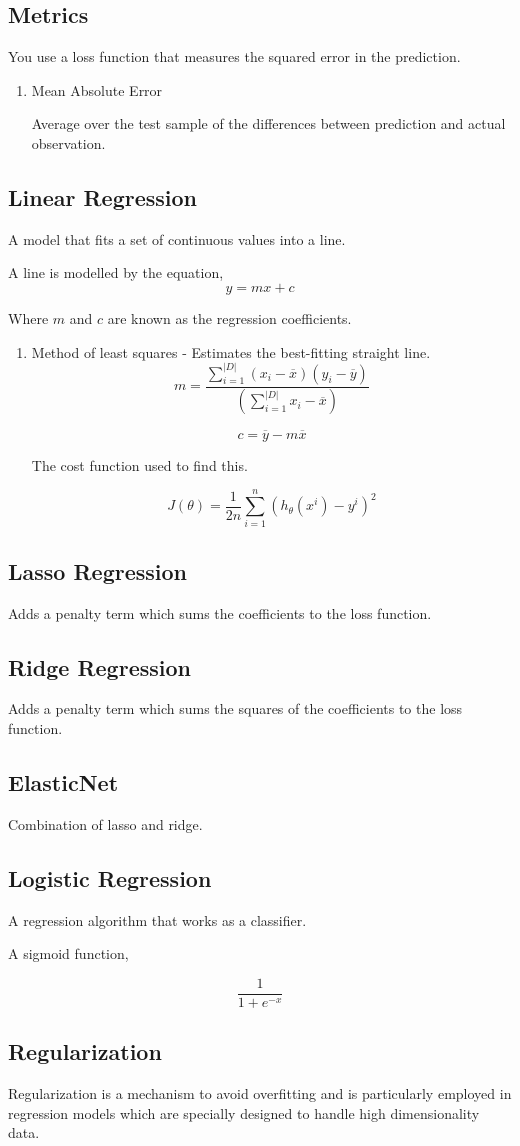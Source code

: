 \documentclass[11pt]{article}
\begin{document}
\subsection{Metrics}
\label{sec:org1847879}
You use a loss function that measures the squared error in the prediction.
\begin{enumerate}
\item Mean Absolute Error
\label{sec:org17507b6}

Average over the test sample of the differences between prediction and actual observation.
\end{enumerate}
\subsection{Linear Regression}
\label{sec:org26c8b6d}
A model that fits a set of continuous values into a line.

A line is modelled by the equation,
$$y = mx + c$$

Where \(m\) and \(c\) are known as the regression coefficients.
\begin{enumerate}
\item Method of least squares - Estimates the best-fitting straight line.
\label{sec:org6c310e0}
$$m = \frac{\sum_{i=1}^{|D|} (x_i - \overline{x})(y_i - \overline{y})}{(\sum_{i=1}^{|D|}x_i - \overline{x})}$$

$$c = \overline{y} - m\overline{x}$$

The cost function used to find this.

$$J(\theta) = \frac{1}{2n}\sum_{i=1}^n(h_{\theta}(x^i) - y^i)^{2}$$
\end{enumerate}
\subsection{Lasso Regression}
\label{sec:org3312a74}
Adds a penalty term which sums the coefficients to the loss function.
\subsection{Ridge Regression}
\label{sec:orgd8d5008}
Adds a penalty term which sums the squares of the coefficients to the loss function.
\subsection{ElasticNet}
\label{sec:org4f9c444}
Combination of lasso and ridge.
\subsection{Logistic Regression}
\label{sec:orga0398f7}
A regression algorithm that works as a classifier.

A sigmoid function,

$$\frac{1}{1+ e^{-x}}$$
\subsection{Regularization}
\label{sec:orge4169a5}
Regularization is a mechanism to avoid overfitting and is particularly employed in regression models which are specially designed to handle high dimensionality data.
\end{document}
